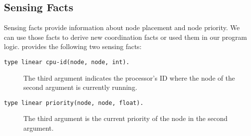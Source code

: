 \subsection{Sensing Facts}

Sensing facts provide information about node placement and node priority. We can use those facts
to derive new coordination facts or used them in our program logic. \lang provides the following two
sensing facts:

\begin{description}
   \item[\texttt{type linear cpu-id(node, node, int).}] The third argument indicates the processor's ID where the node of the second argument is currently running.
   \item[\texttt{type linear priority(node, node, float).}] The third argument is the current priority of the node in the second argument.
\end{description}
